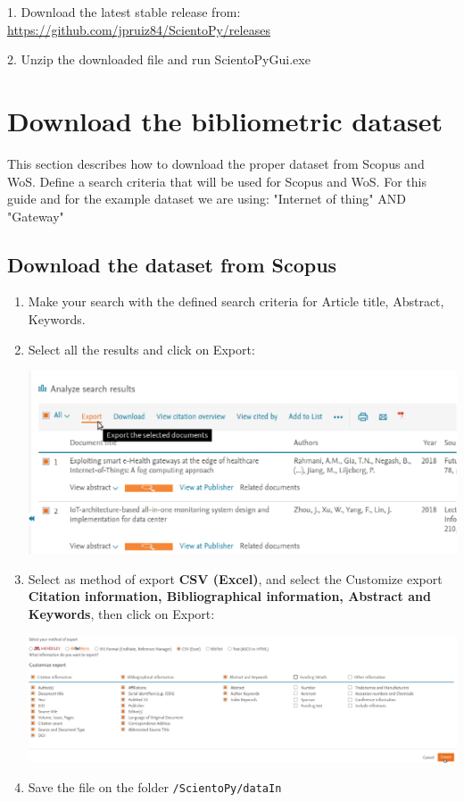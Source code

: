 \documentclass[10pt,letterpaper]{article}
\begin{document}
1. Download the latest stable release from: \url{https://github.com/jpruiz84/ScientoPy/releases}

2. Unzip the downloaded file and run ScientoPyGui.exe

\section{Download the bibliometric dataset}
This section describes how to download the proper dataset from Scopus and WoS. Define a search criteria that will be used for Scopus and WoS. For this guide and for the example dataset we are using: "Internet of thing"  AND  "Gateway" 

\subsection{Download the dataset from Scopus}
\begin{enumerate}
\item Make your search with the defined search criteria for Article title, Abstract, Keywords. 
\item Select all the results and click on Export:
	\begin{center}
		\includegraphics[scale=0.33]{./figures/scopus1.eps}
	\end{center}

\item Select as method of export \textbf{CSV (Excel)}, and select the Customize export \textbf{Citation information, Bibliographical information, Abstract and Keywords}, then click on Export: 
	\begin{center}
		\includegraphics[scale=0.3]{./figures/scopus2.eps}
	\end{center}

\item Save the file on the folder \verb|/ScientoPy/dataIn|
\end{enumerate}
\end{document}
